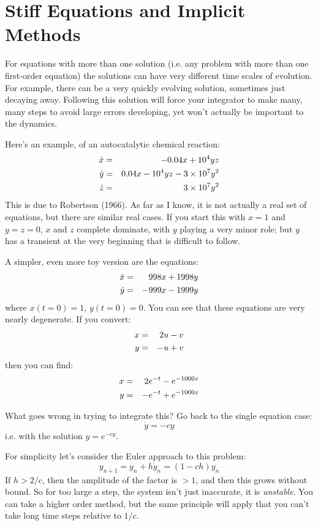 \section{Stiff Equations and Implicit Methods}

For equations with more than one solution (i.e. any problem with more
than one first-order equation) the solutions can have very different
time scales of evolution. For example, there can be a very quickly
evolving solution, sometimes just decaying away. Following this
solution will force your integrator to make many, many steps to avoid
large errors developing, yet won't actually be important to the
dynamics. 

Here's an example, of an autocatalytic chemical reaction:
\begin{eqnarray}
{\dot x} &=& - 0.04 x + 10^4 y z \cr
{\dot y} &=& 0.04 x - 10^4 y z - 3\times 10^7 y^2 \cr
{\dot z} &=& 3\times 10^7 y^2 
\end{eqnarray}
This is due to Robertson (1966). As far as I know, it is not actually
a real set of equations, but there are similar real cases. If you
start this with $x=1$ and $y=z=0$, $x$ and $z$ complete dominate, with
$y$ playing a very minor role; but $y$ has a transient at the very
beginning that is difficult to follow.

A simpler, even more toy version are the equations:
\begin{eqnarray}
{\dot x} &=& 998 x + 1998 y \cr
{\dot y} &=& -999 x - 1999 y 
\end{eqnarray}
where $x(t=0)=1$, $y(t=0)=0$.  You can see that these equations are
very nearly degenerate. If you convert:
\begin{eqnarray}
  x &=& 2u -v \cr
  y &=& -u + v
\end{eqnarray}
then you can find:
\begin{eqnarray}
   x &=& 2 e^{-t} - e^{-1000x} \cr
   y &=& - e^{-t} + e^{-1000x} \cr
\end{eqnarray}

What goes wrong in trying to integrate this? Go back to the single
equation case:
\begin{equation}
 {\dot y} = - c y
\end{equation}
i.e. with the solution $y=e^{-cy}$.

For simplicity let's consider the Euler approach to this problem:
\begin{equation}
y_{n+1} = y_n + h {\dot y}_n = (1-ch) y_n
\end{equation}
If $h>2/c$, then the amplitude of the factor is $>1$, and then this
grows without bound. So for too large a step, the system isn't just
inaccurate, it is {\it unstable}. You can take a higher order method,
but the same principle will apply that you can't take long time steps
relative to $1/c$. 


